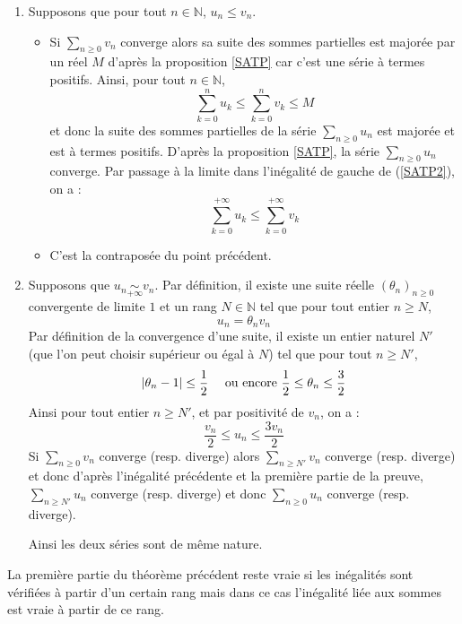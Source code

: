 \documentclass[french,11pt,twoside]{VcCours}
\newcommand{\Sum}[2]{\ensuremath{\textstyle{\sum\limits_{#1}^{#2}}}}
\begin{document}
\begin{Demonstration}{}
\newpage

\begin{enumerate}
\item Supposons que pour tout $n \in \mathbb{N}$, $u_n \leq v_n$.

\begin{itemize}
\item Si $\Sum{n \geq 0}{} v_n$ converge alors sa suite des sommes partielles est majorée par un réel $M$  d'après la proposition \ref{SATP} car c'est une série à termes positifs. Ainsi, pour tout $n \in \mathbb{N}$,
\begin{equation}\label{SATP2} 
\sum_{k=0}^n u_k \leq \sum_{k=0}^n v_k \leq M
\end{equation}
et donc la suite des sommes partielles de la série $\Sum{n \geq 0}{} u_n$ est majorée et est à termes positifs. D'après la proposition \ref{SATP}, la série $\Sum{n \geq 0}{} u_n$ converge. Par passage à la limite dans l'inégalité de gauche de (\ref{SATP2}), on a :
$$  \sum_{k=0}^{+\infty} u_k \leq \sum_{k=0}^{+ \infty} v_k $$
\item C'est la contraposée du point précédent.
\end{itemize}
\item Supposons que $u_n \underset{+\infty}{\sim} v_n$. Par définition, il existe une suite réelle $(\theta_n)_{n \geq 0}$ convergente de limite $1$ et un rang $N \in \mathbb{N}$ tel que pour tout entier $n \geq N$,
$$ u_n = \theta_n v_n $$
Par définition de la convergence d'une suite, il existe un entier naturel $N'$ (que l'on peut choisir supérieur ou égal à $N$) tel que pour tout $n \geq N'$,
$$ \vert \theta_n - 1 \vert \leq \frac{1}{2} \quad \hbox{ ou encore } \frac{1}{2} \leq \theta_n \leq \frac{3}{2}$$
Ainsi pour tout entier $n \geq N'$, et par positivité de $v_n$, on a :
$$ \frac{v_n}{2} \leq u_n \leq \frac{3v_n}{2}$$
Si $\Sum{n\geq0}{} v_n$ converge (resp. diverge) alors $\Sum{n\geq N'}{} v_n$ converge (resp. diverge) et donc d'après l'inégalité précédente et la première partie de la preuve, $\Sum{n\geq N'}{} u_n$ converge (resp. diverge) et donc $\Sum{n\geq 0}{} u_n$ converge (resp. diverge).

Ainsi les deux séries sont de même nature.
\end{enumerate}
\end{Demonstration}

\begin{Remarque}{} La première partie du théorème précédent reste vraie si les inégalités sont vérifiées à partir d'un certain rang mais dans ce cas l'inégalité liée aux sommes est vraie à partir de ce rang.
\end{Remarque}
\end{document}
